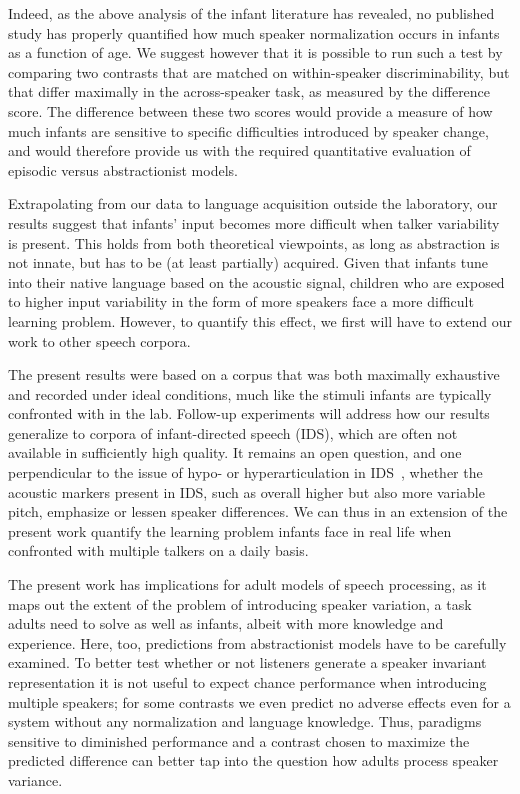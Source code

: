 \documentclass[10pt,letterpaper]{article}
\begin{document}
Indeed, as the above analysis of the infant literature has revealed, no published study has properly quantified how much speaker normalization occurs in infants as a function of age.
We suggest however that it is possible to run such a test by comparing two contrasts that are matched on within-speaker discriminability, but that differ maximally in the across-speaker task, as measured by the difference score. The difference between these two scores would provide a measure of how much infants are sensitive to specific difficulties introduced by speaker change, and would therefore provide us with the required quantitative evaluation of episodic versus abstractionist models. 

Extrapolating from our data to language acquisition outside the laboratory, our results suggest that infants' input becomes more difficult when talker variability is present. This holds from both theoretical viewpoints, as long as abstraction is not innate, but has to be (at least partially) acquired. Given that infants tune into their native language based on the acoustic signal, children who are exposed to higher input variability in the form of more speakers face a more difficult learning problem. However, to quantify this effect, we first will have to extend our work to other speech corpora. 

The present results were based on a corpus that was both maximally exhaustive and recorded under ideal conditions, much like the stimuli infants are typically confronted with in the lab. Follow-up experiments will address how our results generalize to corpora of infant-directed speech (IDS), which are often not available in sufficiently high quality. It remains an open question, and one perpendicular to the issue of hypo- or hyperarticulation in IDS~\cite{Martin2015}, whether the acoustic markers present in IDS, such as overall higher but also more variable pitch, emphasize or lessen speaker differences. We can thus in an extension of the present work quantify the learning problem infants face in real life when confronted with multiple talkers on a daily basis.

The present work has implications for adult models of speech processing, as it maps out the extent of the problem of introducing speaker variation, a task adults need to solve as well as infants, albeit with more knowledge and experience. Here, too, predictions from abstractionist models have to be carefully examined. To better test whether or not listeners generate a speaker invariant representation it is not useful to expect chance performance when introducing multiple speakers; for some contrasts we even predict no adverse effects even for a system without any normalization and language knowledge. Thus, paradigms sensitive to diminished performance and a contrast chosen to maximize the predicted difference can better tap into the question how adults process speaker variance.  
\end{document}
